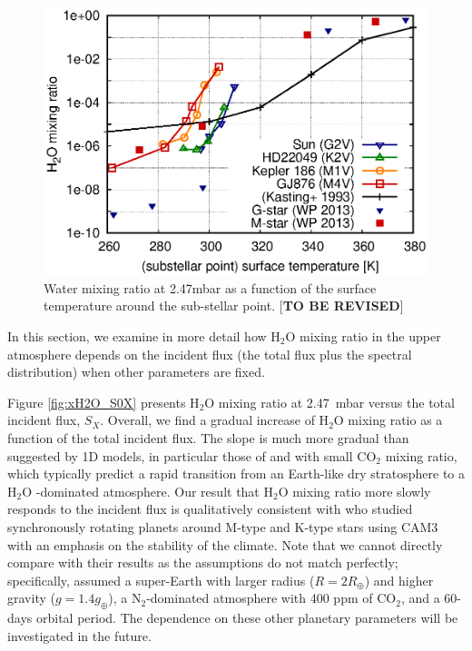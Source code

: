 \documentclass[11pt,numberedappendix,twocolappendix,]{emulateapj}
\def\water{H$_2$O }
\def\preslevel{2.47}
\def\memo#1{\color{red}$[${\bf #1}$]$ \color{black}}
\begin{document}
\begin{figure}[!h]
    \begin{center}
    \includegraphics[width=\hsize]{fig/AqOH0TLS_tsurf_xH2O_GCM_Kasting_WP.eps}
    \end{center}
\caption{Water mixing ratio at \preslevel mbar as a function of the surface temperature around the sub-stellar point. \memo{TO BE REVISED}}                                                                                                             
\label{fig:AqOH0TLS_tsurf_xH2O_GCM_Kasting_WP}
\end{figure}

In this section, we examine in more detail how \water mixing ratio in the upper atmosphere depends on the incident flux (the total flux plus the spectral distribution) when other parameters are fixed. 

Figure \ref{fig:xH2O_S0X} presents \water mixing ratio at \preslevel ~mbar versus the total incident flux, $S_X$. 
Overall, we find a gradual increase of \water mixing ratio as a function of the total incident flux. 
The slope is much more gradual than suggested by 1D models, in particular those  of \citet{Kasting1993} and \citet{Wordsworth2013} with small CO$_2$ mixing ratio, which typically predict a rapid transition from an Earth-like dry stratosphere to a \water-dominated atmosphere. 
Our result that \water mixing ratio more slowly responds to the incident flux is qualitatively consistent with \citet{Yang2013} who studied synchronously rotating planets around M-type and K-type stars using CAM3 with an emphasis on the stability of the climate. 
Note that we cannot directly compare with their results as the assumptions do not match perfectly; specifically, \cite{Yang2013} assumed a super-Earth with larger radius ($R=2R_{\oplus}$) and higher gravity ($g=1.4g_{\oplus}$), a N$_2$-dominated atmosphere with 400 ppm of CO$_2$, and a 60-days orbital period. 
The dependence on these other planetary parameters will be investigated in the future. 
\end{document}
